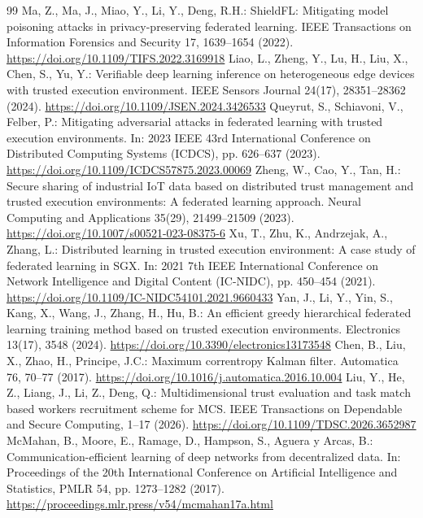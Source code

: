 \documentclass[11pt, a4paper, UTF8, fontset=fandol]{ctexart}
\begin{document}
\begin{thebibliography}{99}
     Ma, Z., Ma, J., Miao, Y., Li, Y., Deng, R.H.: ShieldFL: Mitigating model poisoning attacks in privacy-preserving federated learning. IEEE Transactions on Information Forensics and Security 17, 1639--1654 (2022). \url{https://doi.org/10.1109/TIFS.2022.3169918}
     Liao, L., Zheng, Y., Lu, H., Liu, X., Chen, S., Yu, Y.: Verifiable deep learning inference on heterogeneous edge devices with trusted execution environment. IEEE Sensors Journal 24(17), 28351--28362 (2024). \url{https://doi.org/10.1109/JSEN.2024.3426533}
     Queyrut, S., Schiavoni, V., Felber, P.: Mitigating adversarial attacks in federated learning with trusted execution environments. In: 2023 IEEE 43rd International Conference on Distributed Computing Systems (ICDCS), pp. 626--637 (2023). \url{https://doi.org/10.1109/ICDCS57875.2023.00069}
     Zheng, W., Cao, Y., Tan, H.: Secure sharing of industrial IoT data based on distributed trust management and trusted execution environments: A federated learning approach. Neural Computing and Applications 35(29), 21499--21509 (2023). \url{https://doi.org/10.1007/s00521-023-08375-6}
     Xu, T., Zhu, K., Andrzejak, A., Zhang, L.: Distributed learning in trusted execution environment: A case study of federated learning in SGX. In: 2021 7th IEEE International Conference on Network Intelligence and Digital Content (IC-NIDC), pp. 450--454 (2021). \url{https://doi.org/10.1109/IC-NIDC54101.2021.9660433}
     Yan, J., Li, Y., Yin, S., Kang, X., Wang, J., Zhang, H., Hu, B.: An efficient greedy hierarchical federated learning training method based on trusted execution environments. Electronics 13(17), 3548 (2024). \url{https://doi.org/10.3390/electronics13173548}
     Chen, B., Liu, X., Zhao, H., Principe, J.C.: Maximum correntropy Kalman filter. Automatica 76, 70--77 (2017). \url{https://doi.org/10.1016/j.automatica.2016.10.004}
     Liu, Y., He, Z., Liang, J., Li, Z., Deng, Q.: Multidimensional trust evaluation and task match based workers recruitment scheme for MCS. IEEE Transactions on Dependable and Secure Computing, 1--17 (2026). \url{https://doi.org/10.1109/TDSC.2026.3652987}
     McMahan, B., Moore, E., Ramage, D., Hampson, S., Aguera y Arcas, B.: Communication-efficient learning of deep networks from decentralized data. In: Proceedings of the 20th International Conference on Artificial Intelligence and Statistics, PMLR 54, pp. 1273--1282 (2017). \url{https://proceedings.mlr.press/v54/mcmahan17a.html}
\end{thebibliography}
\end{document}
